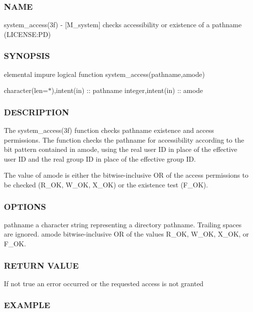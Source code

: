 \subsubsection*{N\+A\+ME}

system\+\_\+access(3f) -\/ \mbox{[}M\+\_\+system\mbox{]} checks accessibility or existence of a pathname (L\+I\+C\+E\+N\+SE\+:PD) 

\subsubsection*{S\+Y\+N\+O\+P\+S\+IS}

elemental impure logical function system\+\_\+access(pathname,amode)

character(len=$\ast$),intent(in) \+:\+: pathname integer,intent(in) \+:\+: amode

\subsubsection*{D\+E\+S\+C\+R\+I\+P\+T\+I\+ON}

\begin{DoxyVerb}The system_access(3f) function checks pathname existence and access
permissions. The function checks the pathname for accessibility
according to the bit pattern contained in amode, using the real user
ID in place of the effective user ID and the real group ID in place
of the effective group ID.

The value of amode is either the bitwise-inclusive OR of the access
permissions to be checked (R_OK, W_OK, X_OK) or the existence test (F_OK).
\end{DoxyVerb}


\subsubsection*{O\+P\+T\+I\+O\+NS}

pathname a character string representing a directory pathname. Trailing spaces are ignored. amode bitwise-\/inclusive OR of the values R\+\_\+\+OK, W\+\_\+\+OK, X\+\_\+\+OK, or F\+\_\+\+OK.

\subsubsection*{R\+E\+T\+U\+RN V\+A\+L\+UE}

If not true an error occurred or the requested access is not granted

\subsubsection*{E\+X\+A\+M\+P\+LE}

